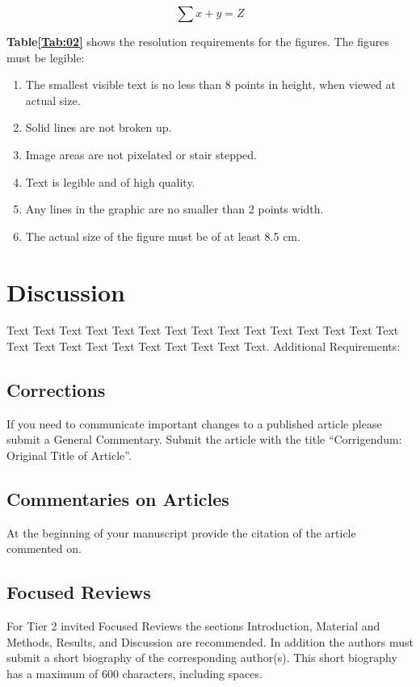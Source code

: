 \documentclass{frontiersSCNS} %
\begin{document}
\begin{equation}
\sum x+ y =Z\label{eq:01}
\end{equation}

\textbf{Table\ref{Tab:02}} shows the resolution requirements for the figures. The figures must be legible:
\begin{enumerate}
\item The smallest visible text is no less than 8 points in height, when viewed at actual size.
\item Solid lines are not broken up.
\item Image areas are not pixelated or stair stepped.
\item Text is legible and of high quality.
\item Any lines in the graphic are no smaller than 2 points width.
\item The actual size of the figure must be of at least 8.5 cm.
\end{enumerate}

\section{Discussion}

Text Text Text Text Text Text  Text Text Text Text Text Text Text Text Text  Text Text Text Text Text Text Text Text Text Text.
Additional Requirements:
\subsection{Corrections}

If you need to communicate important changes to a published article please submit a General Commentary. Submit the article with the title “Corrigendum: Original Title of Article”.

\subsection{Commentaries on Articles}

At the beginning of your manuscript provide the citation of the article commented on.

\subsection{Focused Reviews}

For Tier 2 invited Focused Reviews the sections Introduction, Material and Methods, Results, and Discussion are recommended. In addition the authors must submit a short biography of the corresponding author(s). This short biography has a maximum of 600 characters, including spaces.
\end{document}
